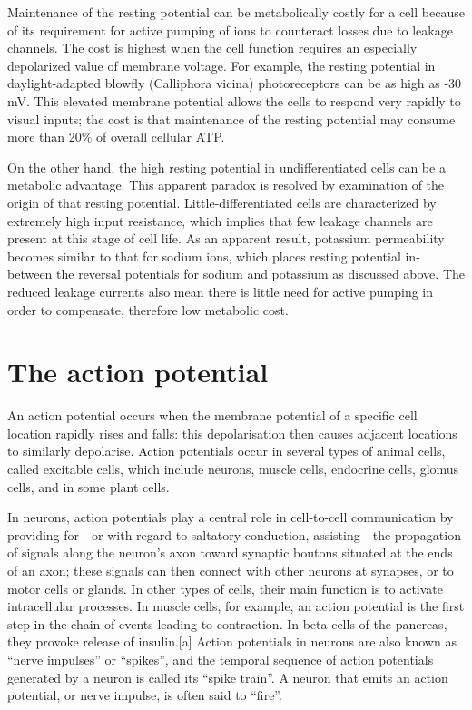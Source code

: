 \documentclass[]{book}
\begin{document}
Maintenance of the resting potential can be metabolically costly for a cell because of its requirement for active pumping of ions to counteract losses due to leakage channels. The cost is highest when the cell function requires an especially depolarized value of membrane voltage. For example, the resting potential in daylight-adapted blowfly (Calliphora vicina) photoreceptors can be as high as -30 mV. This elevated membrane potential allows the cells to respond very rapidly to visual inputs; the cost is that maintenance of the resting potential may consume more than 20\% of overall cellular ATP.

On the other hand, the high resting potential in undifferentiated cells can be a metabolic advantage. This apparent paradox is resolved by examination of the origin of that resting potential. Little-differentiated cells are characterized by extremely high input resistance, which implies that few leakage channels are present at this stage of cell life. As an apparent result, potassium permeability becomes similar to that for sodium ions, which places resting potential in-between the reversal potentials for sodium and potassium as discussed above. The reduced leakage currents also mean there is little need for active pumping in order to compensate, therefore low metabolic cost.

\hypertarget{the-action-potential}{%
\section{The action potential}\label{the-action-potential}}

An action potential occurs when the membrane potential of a specific cell location rapidly rises and falls: this depolarisation then causes adjacent locations to similarly depolarise. Action potentials occur in several types of animal cells, called excitable cells, which include neurons, muscle cells, endocrine cells, glomus cells, and in some plant cells.

In neurons, action potentials play a central role in cell-to-cell communication by providing for---or with regard to saltatory conduction, assisting---the propagation of signals along the neuron's axon toward synaptic boutons situated at the ends of an axon; these signals can then connect with other neurons at synapses, or to motor cells or glands. In other types of cells, their main function is to activate intracellular processes. In muscle cells, for example, an action potential is the first step in the chain of events leading to contraction. In beta cells of the pancreas, they provoke release of insulin.{[}a{]} Action potentials in neurons are also known as ``nerve impulses'' or ``spikes'', and the temporal sequence of action potentials generated by a neuron is called its ``spike train''. A neuron that emits an action potential, or nerve impulse, is often said to ``fire''.
\end{document}
